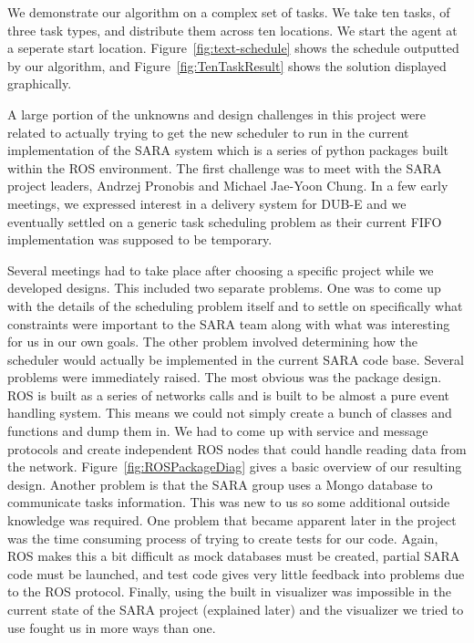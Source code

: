 \documentclass[11pt]{article}
\begin{document}
We demonstrate our algorithm
on a complex set of tasks.
We take ten tasks,
of three task types,
and distribute them across ten locations.
We start the agent at a seperate start location.
Figure~\ref{fig:text-schedule}
shows the schedule outputted by our algorithm,
and Figure~\ref{fig:TenTaskResult} shows the solution
displayed graphically.

A large portion of the unknowns and design
challenges in this project were related to
actually trying to get the new scheduler to
run in the current implementation of the SARA
system which is a series of python packages
built within the ROS environment. The first
challenge was to meet with the SARA project
leaders, Andrzej Pronobis and Michael Jae-Yoon
Chung. In a few early meetings, we expressed
interest in a delivery system for DUB-E and we
eventually settled on a generic task scheduling
problem as their current FIFO implementation was
supposed to be temporary.

Several meetings had to take place after choosing
a specific project while we developed designs.
This included two separate problems. One was to
come up with the details of the scheduling problem
itself and to settle on specifically what constraints
were important to the SARA team along with what was
interesting for us in our own goals. The other problem
involved determining how the scheduler would actually
be implemented in the current SARA code base. Several
problems were immediately raised. The most obvious was
the package design. ROS is built as a series of networks
calls and is built to be almost a pure event handling
system. This means we could not simply create a bunch
of classes and functions and dump them in. We had to come
up with service and message protocols and create independent
ROS nodes that could handle reading data from the network.
Figure~\ref{fig:ROSPackageDiag} gives a basic overview of
our resulting design. Another problem is that the SARA group
uses a Mongo database to communicate tasks information. This
was new to us so some additional outside knowledge was
required. One problem that became apparent later in the
project was the time consuming process of trying to create
tests for our code. Again, ROS makes this a bit difficult
as mock databases must be created, partial SARA code must be
launched, and test code gives very little feedback into problems
due to the ROS protocol. Finally, using the built in visualizer
was impossible in the current state of the SARA project
(explained later) and the visualizer we tried to use fought
us in more ways than one.
\end{document}
